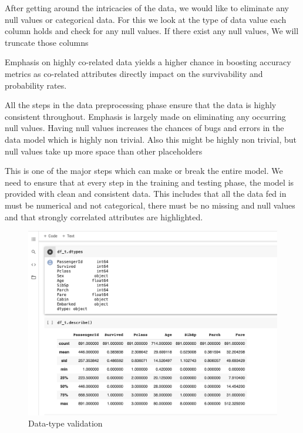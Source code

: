 \documentclass[12pt]{article}
\newcommand{\nd}{\noindent}
\begin{document}
\nd After getting around the intricacies of the data, we would like to eliminate any null values or categorical data. For this we look at the type of data value each column holds and check for any null values. If there exist any null values, We will truncate those columns

\nd Emphasis on highly co-related data yields a higher chance in boosting accuracy metrics as co-related attributes directly impact on the survivability and probability rates.

\nd All the steps in the data preprocessing phase ensure that the data is highly consistent throughout. Emphasis is largely made on eliminating any occurring null values. Having null values increases the chances of bugs and errors in the data model which is highly non trivial. Also this might be highly non trivial, but null values take up more space than other placeholders

\nd This is one of the major steps which can make or break the entire model. We need to ensure that at every step in the training and testing phase, the model is provided with clean and consistent data. This includes that all the data fed in must be numerical and not categorical, there must be no missing and null values and that strongly correlated attributes are highlighted.


\begin{center}
\begin{figure}[h]
\centerline{\includegraphics[scale=.35]{part5.png}}
\caption{Data-type validation}
\end{figure}
\end{center}
\end{document}
